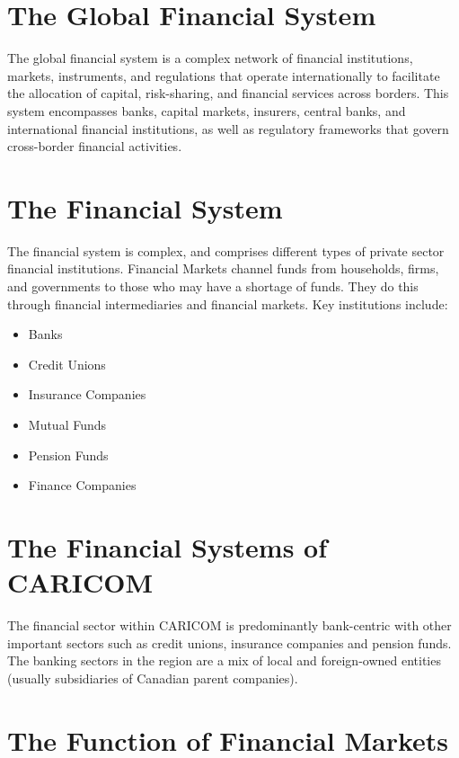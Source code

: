 \tableofcontents

\newpage



\section{The Global Financial System}

The global financial system is a complex network of financial institutions, markets, instruments, and regulations that operate internationally to facilitate the allocation of capital, risk-sharing, and financial services across borders. This system encompasses banks, capital markets, insurers, central banks, and international financial institutions, as well as regulatory frameworks that govern cross-border financial activities.

\section{The Financial System}

The financial system is complex, and comprises different types of private sector financial institutions. Financial Markets channel funds from households, firms, and governments to those who may have a shortage of funds. They do this through financial intermediaries and financial markets. Key institutions include:
\begin{itemize}
    \item Banks
    \item Credit Unions
    \item Insurance Companies
    \item Mutual Funds
    \item Pension Funds
    \item Finance Companies
\end{itemize}

\section{The Financial Systems of CARICOM}

The financial sector within CARICOM is predominantly bank-centric with other important sectors such as credit unions, insurance companies and pension funds. The banking sectors in the region are a mix of local and foreign-owned entities (usually subsidiaries of Canadian parent companies).

\section{The Function of Financial Markets}

